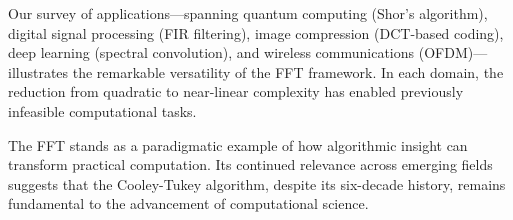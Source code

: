 \documentclass[a4paper]{article}
\theoremstyle{definition}
\begin{document}
Our survey of applications---spanning quantum computing (Shor's algorithm), digital signal processing (FIR filtering), image compression (DCT-based coding), deep learning (spectral convolution), and wireless communications (OFDM)---illustrates the remarkable versatility of the FFT framework. In each domain, the reduction from quadratic to near-linear complexity has enabled previously infeasible computational tasks.

The FFT stands as a paradigmatic example of how algorithmic insight can transform practical computation. Its continued relevance across emerging fields suggests that the Cooley-Tukey algorithm, despite its six-decade history, remains fundamental to the advancement of computational science.




\end{document}
